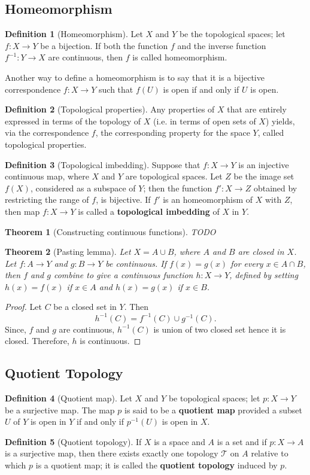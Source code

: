 \documentclass[12pt,reqno]{amsart}
\theoremstyle{plain}
\newtheorem{thm}{Theorem}
\theoremstyle{definition}
\newtheorem{defn}{Definition}
\newcommand{\cal}[1]{\mathcal{#1}}
\begin{document}
\subsection{Homeomorphism}
\begin{defn}[Homeomorphism]
    Let $X$ and $Y$ be the topological spaces; let $f : X \to Y$ be a bijection. If both the function $f$ and the inverse function $f^{-1}: Y \to X$ are continuous, then $f$ is called homeomorphism.
\end{defn}
Another way to define a homeomorphism is to say that it is a bijective correspondence $f: X \to Y$ such that $f(U)$ is open if and only if $U$ is open.
\begin{defn}[Topological properties]
    Any properties of $X$ that are entirely expressed in terms of the topology of $X$ (i.e. in terms of open sets of $X$) yields, via the correspondence $f$, the corresponding property for the space $Y$, called topological properties.
\end{defn}
\begin{defn}[Topological imbedding]
    Suppose that $f : X \to Y$ is an injective continuous map, where $X$ and $Y$ are topological spaces. Let $Z$ be the image set $f(X)$, considered as a subspace of $Y$; then the function $f' : X \to Z$ obtained by restricting the range of $f$, is bijective. If $f'$ is an homeomorphism of $X$ with $Z$, then map $f : X \to Y$ is  called a {\bf topological imbedding} of $X$ in $Y$.
\end{defn}
\begin{thm}[Constructing continuous functions]
    TODO
\end{thm}
\begin{thm}[Pasting lemma]
    Let $X = A \cup B$, where $A$ and $B$ are closed in $X$. Let $f \colon A \to Y$ and $g \colon B \to Y$ be continuous. If $f(x) = g(x)$ for every $x \in A \cap B$, then $f$ and $g$ combine to give a continuous function $h \colon X \to Y$, defined by setting $h(x) = f(x)$ if $x \in A$ and $h(x) = g(x)$ if $x \in B$.
\end{thm}
\begin{proof}
    Let $C$ be a closed set in $Y$. Then
    $$ h^{-1}(C) = f^{-1}(C) \cup g^{-1}(C).$$
    Since, $f$ and $g$ are continuous, $h^{-1}(C)$ is union of two closed set hence it is closed. Therefore, $h$ is continuous.
\end{proof}
\subsection{Quotient Topology}
\begin{defn}[Quotient map]
    Let $X$ and $Y$ be topological spaces; let $p : X \to Y$ be a surjective map. The map $p$ is said to be a {\bf quotient map} provided a subset $U$ of $Y$ is open in $Y$ if and only if $p^{-1}(U)$ is open in $X$.
\end{defn}
\begin{defn}[Quotient topology]
    If $X$ is a space and $A$ is a set and if $p : X \to A$ is a surjective map, then there exists exactly one topology $\cal T$ on $A$ relative to which $p$ is a quotient map; it is called the {\bf quotient topology} induced by $p$.
\end{defn}
\end{document}
